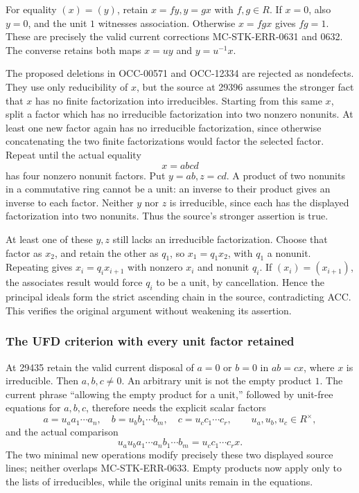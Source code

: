 For equality \((x)=(y)\), retain \(x=fy,y=gx\) with \(f,g\in R\). If \(x=0\), also \(y=0\), and the unit \(1\) witnesses association. Otherwise \(x=fgx\) gives \(fg=1\). These are precisely the valid current corrections MC-\AlgebraIdentifierBreak{}STK-\AlgebraIdentifierBreak{}ERR-\AlgebraIdentifierBreak{}0631 and 0632. The converse retains both maps \(x=uy\) and \(y=u^{-1}x\).

The proposed deletions in OCC-00571 and OCC-12334 are rejected as nondefects. They use only reducibility of \(x\), but the source at 29396 assumes the stronger fact that \(x\) has no finite factorization into irreducibles. Starting from this same \(x\), split a factor which has no irreducible factorization into two nonzero nonunits. At least one new factor again has no irreducible factorization, since otherwise concatenating the two finite factorizations would factor the selected factor. Repeat until the actual equality \[
 x=a b c d
\] has four nonzero nonunit factors. Put \(y=ab,z=cd\). A product of two nonunits in a commutative ring cannot be a unit: an inverse to their product gives an inverse to each factor. Neither \(y\) nor \(z\) is irreducible, since each has the displayed factorization into two nonunits. Thus the source's stronger assertion is true.

At least one of these \(y,z\) still lacks an irreducible factorization. Choose that factor as \(x_2\), and retain the other as \(q_1\), so \(x_1=q_1x_2\), with \(q_1\) a nonunit. Repeating gives \(x_i=q_i x_{i+1}\) with nonzero \(x_i\) and nonunit \(q_i\). If \((x_i)=(x_{i+1})\), the associates result would force \(q_i\) to be a unit, by cancellation. Hence the principal ideals form the strict ascending chain in the source, contradicting ACC. This verifies the original argument without weakening its assertion.

\subsubsection{The UFD criterion with every unit factor retained}\label{algebra-proof-029-the-ufd-criterion-with-every-unit-factor-retained}

At 29435 retain the valid current disposal of \(a=0\) or \(b=0\) in \(ab=cx\), where \(x\) is irreducible. Then \(a,b,c\ne0\). An arbitrary unit is not the empty product \(1\). The current phrase ``allowing the empty product for a unit,'' followed by unit-free equations for \(a,b,c\), therefore needs the explicit scalar factors \[
 a=u_a a_1\cdots a_n,\quad
 b=u_b b_1\cdots b_m,\quad
 c=u_c c_1\cdots c_r,\qquad u_a,u_b,u_c\in R^\times,
\] and the actual comparison \[
 u_a u_b a_1\cdots a_n b_1\cdots b_m
       =u_c c_1\cdots c_r x.
\] The two minimal new operations modify precisely these two displayed source lines; neither overlaps MC-\AlgebraIdentifierBreak{}STK-\AlgebraIdentifierBreak{}ERR-\AlgebraIdentifierBreak{}0633. Empty products now apply only to the lists of irreducibles, while the original units remain in the equations.

